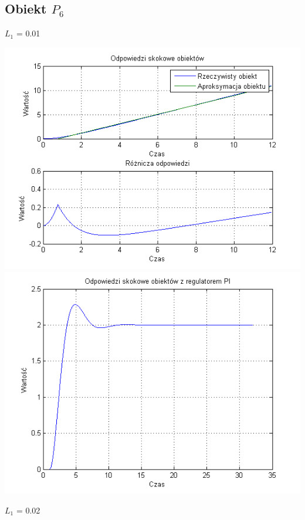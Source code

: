 \documentclass[10pt,a4paper]{article}
\begin{document}
\subsection{Obiekt $P_6$}
$L_1$ = 0.01
\begin{center}
\includegraphics[scale=1]{images/jeden/skrypt_135.png}\\
\includegraphics[scale=1]{images/jeden/skrypt_136.png}\\
\end{center}
\newpage
$L_1$ = 0.02
\end{document}
